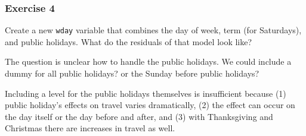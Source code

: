 \documentclass[]{book}
\newenvironment{Shaded}{\begin{snugshade}}{\end{snugshade}}
\newcommand{\CommentTok}[1]{\textcolor[rgb]{0.56,0.35,0.01}{\textit{#1}}}
\newcommand{\KeywordTok}[1]{\textcolor[rgb]{0.13,0.29,0.53}{\textbf{#1}}}
\newcommand{\NormalTok}[1]{#1}
\newcommand{\OperatorTok}[1]{\textcolor[rgb]{0.81,0.36,0.00}{\textbf{#1}}}
\newcommand{\StringTok}[1]{\textcolor[rgb]{0.31,0.60,0.02}{#1}}
\theoremstyle{plain}
\theoremstyle{remark}
\theoremstyle{definition}
\theoremstyle{definition}
\theoremstyle{definition}
\theoremstyle{remark}
\begin{document}
\begin{Shaded}
\end{Shaded}

\hypertarget{exercise-4-38}{%
\subsubsection{Exercise 4}\label{exercise-4-38}}

Create a new \texttt{wday} variable that combines the day of week, term
(for Saturdays), and public holidays. What do the residuals of that
model look like?

The question is unclear how to handle the public holidays. We could
include a dummy for all public holidays? or the Sunday before public
holidays?

Including a level for the public holidays themselves is insufficient
because (1) public holiday's effects on travel varies dramatically, (2)
the effect can occur on the day itself or the day before and after, and
(3) with Thanksgiving and Christmas there are increases in travel as
well.
\end{document}
